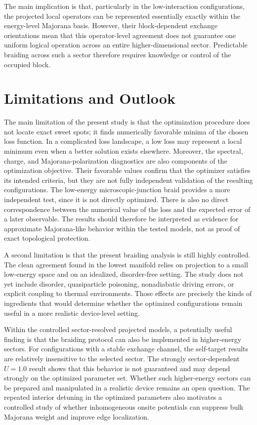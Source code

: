 The main implication is that, particularly in the low-interaction configurations, the projected local operators can be represented essentially exactly within the energy-level Majorana basis. However, their block-dependent exchange orientations mean that this operator-level agreement does not guarantee one uniform logical operation across an entire higher-dimensional sector. Predictable braiding across such a sector therefore requires knowledge or control of the occupied block.


\section{Limitations and Outlook}

The main limitation of the present study is that the optimization procedure does not locate exact sweet spots; it finds numerically favorable minima of the chosen loss function. In a complicated loss landscape, a low loss may represent a local minimum even when a better solution exists elsewhere. Moreover, the spectral, charge, and Majorana-polarization diagnostics are also components of the optimization objective. Their favorable values confirm that the optimizer satisfies its intended criteria, but they are not fully independent validation of the resulting configurations. The low-energy microscopic-junction braid provides a more independent test, since it is not directly optimized. There is also no direct correspondence between the numerical value of the loss and the expected error of a later observable. The results should therefore be interpreted as evidence for approximate Majorana-like behavior within the tested models, not as proof of exact topological protection.

A second limitation is that the present braiding analysis is still highly controlled. The clean agreement found in the lowest manifold relies on projection to a small low-energy space and on an idealized, disorder-free setting. The study does not yet include disorder, quasiparticle poisoning, nonadiabatic driving errors, or explicit coupling to thermal environments. Those effects are precisely the kinds of ingredients that would determine whether the optimized configurations remain useful in a more realistic device-level setting.

Within the controlled sector-resolved projected models, a potentially useful finding is that the braiding protocol can also be implemented in higher-energy sectors. For configurations with a stable exchange channel, the self-target results are relatively insensitive to the selected sector. The strongly sector-dependent $U=1.0$ result shows that this behavior is not guaranteed and may depend strongly on the optimized parameter set. Whether such higher-energy sectors can be prepared and manipulated in a realistic device remains an open question. The repeated interior detuning in the optimized parameters also motivates a controlled study of whether inhomogeneous onsite potentials can suppress bulk Majorana weight and improve edge localization.


